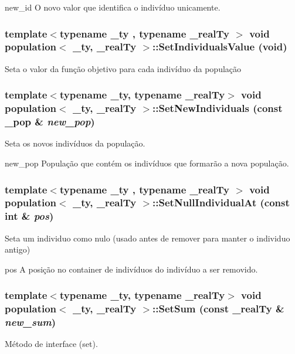 new\_\-id O novo valor que identifica o indivíduo unicamente. \hypertarget{classpopulation_a10331bd5a9f8f4879cea62ee8b1f28c3}{
\subsubsection[{SetIndividualsValue}]{\setlength{\rightskip}{0pt plus 5cm}template$<$typename \_\-ty , typename \_\-realTy $>$ void {\bf population}$<$ \_\-ty, \_\-realTy $>$::SetIndividualsValue (void)}}
\label{classpopulation_a10331bd5a9f8f4879cea62ee8b1f28c3}
Seta o valor da função objetivo para cada indivíduo da população \hypertarget{classpopulation_ac7b74f6cbb098394df06e1c84de0f260}{
\subsubsection[{SetNewIndividuals}]{\setlength{\rightskip}{0pt plus 5cm}template$<$typename \_\-ty, typename \_\-realTy$>$ void {\bf population}$<$ \_\-ty, \_\-realTy $>$::SetNewIndividuals (const {\bf \_\-pop} \& {\em new\_\-pop})}}
\label{classpopulation_ac7b74f6cbb098394df06e1c84de0f260}
Seta os novos indivíduos da população.

new\_\-pop População que contém os indivíduos que formarão a nova população. \hypertarget{classpopulation_aa2cbedb9d90d9c660b4a4369857e1c96}{
\subsubsection[{SetNullIndividualAt}]{\setlength{\rightskip}{0pt plus 5cm}template$<$typename \_\-ty , typename \_\-realTy $>$ void {\bf population}$<$ \_\-ty, \_\-realTy $>$::SetNullIndividualAt (const int \& {\em pos})}}
\label{classpopulation_aa2cbedb9d90d9c660b4a4369857e1c96}
Seta um individuo como nulo (usado antes de remover para manter o individuo antigo)

pos A posição no container de indivíduos do indivíduo a ser removido. \hypertarget{classpopulation_a80e34ba9884327ddc5bafbaedd32014b}{
\subsubsection[{SetSum}]{\setlength{\rightskip}{0pt plus 5cm}template$<$typename \_\-ty, typename \_\-realTy$>$ void {\bf population}$<$ \_\-ty, \_\-realTy $>$::SetSum (const \_\-realTy \& {\em new\_\-sum})}}
\label{classpopulation_a80e34ba9884327ddc5bafbaedd32014b}
Método de interface (set).

